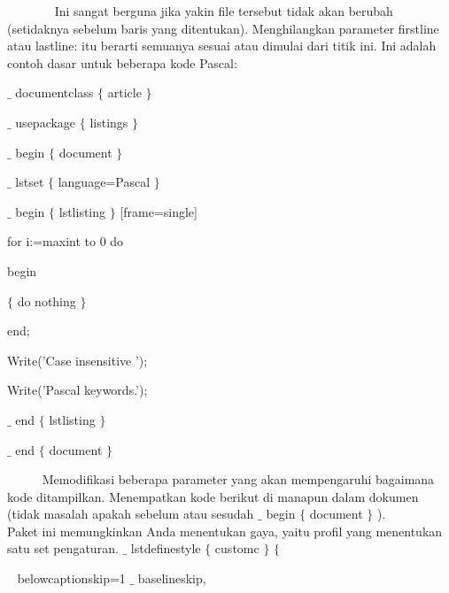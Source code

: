 \noindent ~~~~~~~ Ini sangat berguna jika yakin file tersebut tidak akan berubah (setidaknya sebelum baris yang ditentukan). Menghilangkan parameter firstline atau lastline: itu berarti semuanya sesuai atau dimulai dari titik ini. Ini adalah contoh dasar untuk beberapa kode Pascal:\par


\noindent  $ \_ $ documentclass $ \{ $ article $ \} $ \par


\noindent  $ \_ $ usepackage $ \{ $ listings $ \} $ ~~~~~~~~~~~~ \par


\noindent  $ \_ $ begin $ \{ $ document $ \} $ \par


\noindent  $ \_ $ lstset $ \{ $ language=Pascal $ \} $ ~~~~~~~ \par


\noindent  $ \_ $ begin $ \{ $ lstlisting $ \} $ [frame=single]~ \par


\noindent for i:=maxint to 0 do\par


\noindent begin\par


\noindent  $ \{ $  do nothing  $ \} $ \par


\noindent end;\par


\noindent Write('Case insensitive ');\par


\noindent Write('Pascal keywords.');\par


\noindent  $ \_ $ end $ \{ $ lstlisting $ \} $ \par


\noindent 
\vspace{12pt}
\noindent  $ \_ $ end $ \{ $ document $ \} $ \par


\noindent ~~~~~ Memodifikasi beberapa parameter yang akan mempengaruhi bagaimana kode ditampilkan. Menempatkan kode berikut di manapun dalam dokumen (tidak masalah apakah sebelum atau sesudah  $ \_ $  begin  $ \{ $ document $ \} $ ). ~~~~~ Paket ini memungkinkan Anda menentukan gaya, yaitu profil yang menentukan satu set pengaturan. $ \_ $ lstdefinestyle $ \{ $ customc $ \} $  $ \{ $ \par

{\fontsize{10pt}{10pt}\selectfont ~ belowcaptionskip=1 $ \_ $ baselineskip,}\par


